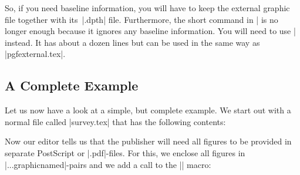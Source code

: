 So, if you need baseline information, you will have to keep the external graphic file
together with its~|.dpth| file. Furthermore, the short command in |
is no longer enough because it ignores any baseline information. You will need to use
| instead. It has about a dozen lines but can be used in
the same way as |pgfexternal.tex|.


\subsection{A Complete Example}

Let us now have a look at a simple, but complete example. We start out
with a normal file called |survey.tex| that has the following
contents:

Now our editor tells us that the publisher will need all figures to be
provided in separate PostScript or |.pdf|-files. For this, we 
enclose all figures in |...graphicnamed|-pairs and we add a call to
the |\pgfrealjobname| macro:

